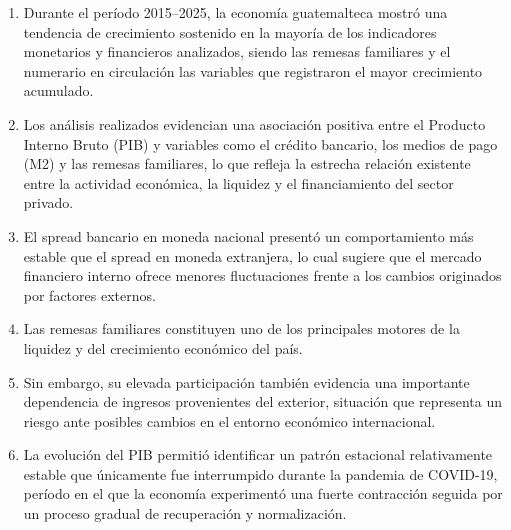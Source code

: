 \begin{enumerate}
    \item Durante el período 2015–2025, la economía guatemalteca mostró una tendencia de crecimiento sostenido en la mayoría de los indicadores monetarios y financieros analizados, siendo las remesas familiares y el numerario en circulación las variables que registraron el mayor crecimiento acumulado.
    \item Los análisis realizados evidencian una asociación positiva entre el Producto Interno Bruto (PIB) y variables como el crédito bancario, los medios de pago (M2) y las remesas familiares, lo que refleja la estrecha relación existente entre la actividad económica, la liquidez y el financiamiento del sector privado.
    \item El spread bancario en moneda nacional presentó un comportamiento más estable que el spread en moneda extranjera, lo cual sugiere que el mercado financiero interno ofrece menores fluctuaciones frente a los cambios originados por factores externos.
    \item Las remesas familiares constituyen uno de los principales motores de la liquidez y del crecimiento económico del país.
    \item Sin embargo, su elevada participación también evidencia una importante dependencia de ingresos provenientes del exterior, situación que representa un riesgo ante posibles cambios en el entorno económico internacional.
    \item La evolución del PIB permitió identificar un patrón estacional relativamente estable que únicamente fue interrumpido durante la pandemia de COVID-19, período en el que la economía experimentó una fuerte contracción seguida por un proceso gradual de recuperación y normalización.
\end{enumerate}

